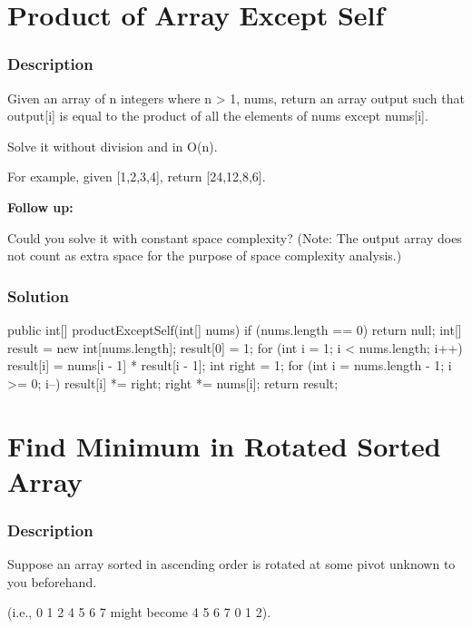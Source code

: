 \newpage

\section{Product of Array Except Self} %

\subsubsection{Description}
Given an array of n integers where n > 1, nums, return an array output such that output[i] is equal to the product of all the elements of nums except nums[i].

Solve it without division and in O(n).

For example, given [1,2,3,4], return [24,12,8,6].

\textbf{Follow up:}

Could you solve it with constant space complexity? (Note: The output array does not count as extra space for the purpose of space complexity analysis.)

\subsubsection{Solution}

\begin{Code}
public int[] productExceptSelf(int[] nums) {
    if (nums.length == 0) {
        return null;
    }
    int[] result = new int[nums.length];
    result[0] = 1;
    for (int i = 1; i < nums.length; i++) {
        result[i] = nums[i - 1] * result[i - 1];
    }
    int right = 1;
    for (int i = nums.length - 1; i >= 0; i--) {
        result[i] *= right;
        right *= nums[i];
    }
    return result;
}
\end{Code}

\newpage

\section{Find Minimum in Rotated Sorted Array} %

\subsubsection{Description}
Suppose an array sorted in ascending order is rotated at some pivot unknown to you beforehand.

(i.e., 0 1 2 4 5 6 7 might become 4 5 6 7 0 1 2).


